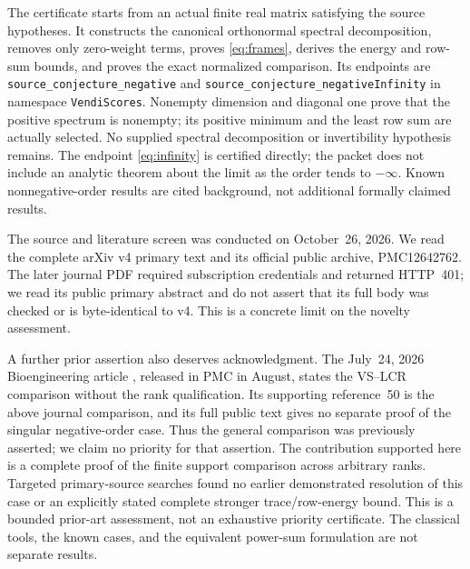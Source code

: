 \documentclass[11pt]{article}
\begin{document}
The certificate starts from an actual finite real matrix satisfying the
source hypotheses. It constructs the canonical orthonormal spectral
decomposition, removes only zero-weight terms, proves
\eqref{eq:frames}, derives the energy and row-sum bounds, and proves the
exact normalized comparison. Its endpoints are
\texttt{source\_conjecture\_negative} and
\texttt{source\_conjecture\_negativeInfinity} in namespace
\texttt{VendiScores}. Nonempty dimension and diagonal one prove that the
positive spectrum is nonempty; its positive minimum and the least row
sum are actually selected. No supplied spectral decomposition or
invertibility hypothesis remains. The endpoint \eqref{eq:infinity} is
certified directly; the packet does not include an analytic theorem
about the limit as the order tends to $-\infty$. Known nonnegative-order
results are cited background, not additional formally claimed results.

The source and literature screen was conducted on October~26, 2026.
We read the complete arXiv v4 primary text and its official public
archive, PMC12642762. The later journal PDF required subscription
credentials and returned HTTP~401; we read its public primary abstract
and do not assert that its full body was checked or is byte-identical
to v4. This is a concrete limit on the novelty assessment.

A further prior assertion also deserves acknowledgment. The July~24,
2026 Bioengineering article \cite{Couch}, released in PMC in August,
states the VS--LCR comparison without the rank qualification. Its
supporting reference~50 is the above journal comparison, and its full
public text gives no separate proof of the singular negative-order
case. Thus the general comparison was previously asserted; we claim no
priority for that assertion. The contribution supported here is a
complete proof of the finite support comparison across arbitrary
ranks. Targeted primary-source searches found no earlier demonstrated
resolution of this case or an explicitly stated complete stronger
trace/row-energy bound. This is a bounded prior-art assessment, not an
exhaustive priority certificate. The classical tools, the known cases,
and the equivalent power-sum formulation are not separate results.
\end{document}
